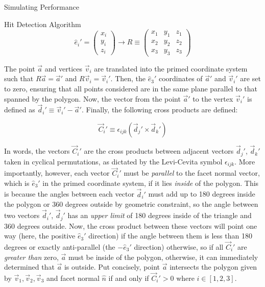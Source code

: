\begin{section}{Simulating Performance}
\begin{subsection}{Hit Detection Algorithm}
\begin{equation}
    \hat{e}_i' = \begin{pmatrix} x_i \\ y_i \\ z_i \end{pmatrix}
    \rightarrow
    R \equiv \begin{pmatrix} 
        x_1 & y_1 & z_1 \\
        x_2 & y_2 & z_2 \\
        x_3 & y_3 & z_3
    \end{pmatrix}
\end{equation}

\noindent The point $\vec{a}$ and vertices $\vec{v}_i$ are translated into the primed coordinate system such that $R\vec{a} = \vec{a}'$ and $R\vec{v}_i = \vec{v}_{i}'$. Then, the $\hat{e}_3'$ coordinates of $\vec{a}'$ and $\vec{v}_i'$ are set to zero, ensuring that all points considered are in the same plane parallel to that spanned by the polygon. Now, the vector from the point $\vec{a}'$ to the vertex $\vec{v}_{i}'$ is defined as $\vec{d}_{i}' \equiv \vec{v}_{i}'-\vec{a}'$. Finally, the following cross products are defined:

\begin{equation}
    \vec{C}_{i}' \equiv \epsilon_{ijk}(\vec{d}_{j}'\times\vec{d}_{k}')
\end{equation}

\noindent In words, the vectors $\vec{C}_{i}'$ are the cross products between adjacent vectors $\vec{d}_{j}'$, $\vec{d}_{k}'$ taken in cyclical permutations, as dictated by the Levi-Cevita symbol $\epsilon_{ijk}$. More importantly, however, each vector $\vec{C}_{i}'$ must be \textit{parallel} to the facet normal vector, which is $\hat{e}_{3}'$ in the primed coordinate system, if it lies \textit{inside} of the polygon. This is because the angles between each vector $\vec{d}_{i}'$ must add up to 180 degrees inside the polygon or 360 degrees outside by geometric constraint, so the angle between two vectors $\vec{d}_{i}'$, $\vec{d}_{j}'$ has an \textit{upper limit} of 180 degrees inside of the triangle and 360 degrees outside. Now, the cross product between these vectors will point one way (here, the positive $\hat{e}_3'$ direction) if the angle between them is less than 180 degrees or exactly anti-parallel (the $-\hat{e}_3'$ direction) otherwise, so if all $\vec{C}_{i}'$ are \textit{greater than} zero, $\vec{a}$ must be inside of the polygon, otherwise, it can immediately determined that $\vec{a}$ is outside. Put concisely, point $\vec{a}$ intersects the polygon given by $\vec{v}_1, \vec{v}_2, \vec{v}_3$ and facet normal $\hat{n}$ if and only if $\vec{C}_{i}' > 0$ where $i\in[1,2,3]$.


\end{subsection}
\end{section}
